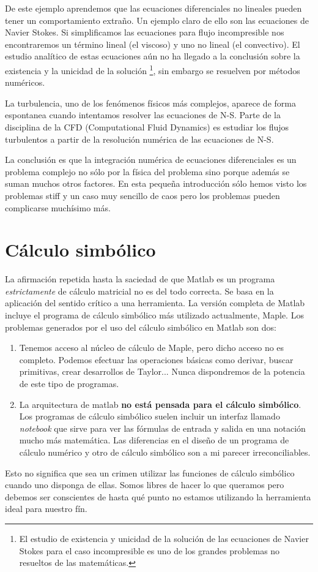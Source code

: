 De este ejemplo aprendemos que las ecuaciones diferenciales no lineales
pueden tener un comportamiento extraño. Un ejemplo claro de ello son
las ecuaciones de Navier Stokes. Si simplificamos las ecuaciones para
flujo incompresible nos encontraremos un término lineal (el viscoso)
y uno no lineal (el convectivo). El estudio analítico de estas ecuaciones
aún no ha llegado a la conclusión sobre la existencia y la unicidad
de la solución%
\footnote{El estudio de existencia y unicidad de la solución de las ecuaciones
de Navier Stokes para el caso incompresible es uno de los grandes
problemas no resueltos de las matemáticas.%
}, sin embargo se resuelven por métodos numéricos.

La turbulencia, uno de los fenómenos físicos más complejos, aparece
de forma espontanea cuando intentamos resolver las ecuaciones de N-S.
Parte de la disciplina de la CFD (Computational Fluid Dynamics) es
estudiar los flujos turbulentos a partir de la resolución numérica
de las ecuaciones de N-S.

La conclusión es que la integración numérica de ecuaciones diferenciales
es un problema complejo no sólo por la física del problema sino porque
además se suman muchos otros factores. En esta pequeña introducción
sólo hemos visto los problemas stiff y un caso muy sencillo de caos
pero los problemas pueden complicarse muchísimo más.


\section{Cálculo simbólico}

La afirmación repetida hasta la saciedad de que Matlab es un programa
\emph{estrictamente} de cálculo matricial no es del todo correcta.
Se basa en la aplicación del sentido crítico a una herramienta. La
versión completa de Matlab incluye el programa de cálculo simbólico
más utilizado actualmente, Maple. Los problemas generados por el uso
del cálculo simbólico en Matlab son dos:

\begin{enumerate}
\item Tenemos acceso al núcleo de cálculo de Maple, pero dicho acceso no
es completo. Podemos efectuar las operaciones básicas como derivar,
buscar primitivas, crear desarrollos de Taylor... Nunca dispondremos
de la potencia de este tipo de programas.
\item La arquitectura de matlab \textbf{no está pensada para el cálculo
simbólico}. Los programas de cálculo simbólico suelen incluir un interfaz
llamado \emph{notebook} que sirve para ver las fórmulas de entrada
y salida en una notación mucho más matemática. Las diferencias en
el diseño de un programa de cálculo numérico y otro de cálculo simbólico
son a mi parecer irreconciliables.
\end{enumerate}
Esto no significa que sea un crimen utilizar las funciones de cálculo
simbólico cuando uno disponga de ellas. Somos libres de hacer lo que
queramos pero debemos ser conscientes de hasta qué punto no estamos
utilizando la herramienta ideal para nuestro fín.

